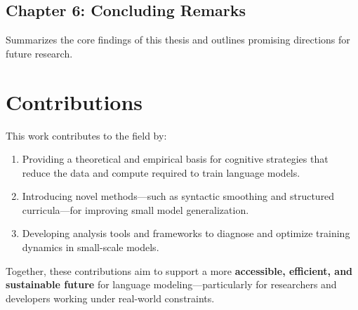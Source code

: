 \subsection*{Chapter 6: Concluding Remarks}

Summarizes the core findings of this thesis and outlines promising directions for future research.

\section*{Contributions}

This work contributes to the field by:

\begin{enumerate}
    \item Providing a theoretical and empirical basis for cognitive strategies that reduce the data and compute required to train language models.
    \item Introducing novel methods—such as syntactic smoothing and structured curricula—for improving small model generalization.
    \item Developing analysis tools and frameworks to diagnose and optimize training dynamics in small-scale models.
\end{enumerate}

Together, these contributions aim to support a more \textbf{accessible, efficient, and sustainable future} for language modeling—particularly for researchers and developers working under real-world constraints.
